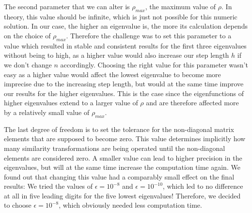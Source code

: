 \documentclass[10pt,a4paper]{article}
\begin{document}
The second parameter that we can alter is $\rho_{max}$, the maximum value of $\rho$. In theory, this value should be infinite, which is just not possible for this numeric solution. In our case, the higher an eigenvalue is, the more its calculation depends on the choice of $\rho_{max}$. Therefore the challenge was to set this parameter to a value which resulted in stable and consistent results for the first three eigenvalues without being to high, as a higher value would also increase our step length $h$ if we don't change $n$ accordingly. Choosing the right value for this parameter wasn't easy as a higher value would affect the lowest eigenvalue to become more imprecise due to the increasing step length, but would at the same time improve our results for the higher eigenvalues. This is the case since the eigenfunctions of higher eigenvalues extend to a larger value of $\rho$ and are therefore affected more by a relatively small value of $\rho_{max}$.

The last degree of freedom is to set the tolerance for the non-diagonal matrix elements that are supposed to become zero. This value determines implicitly how many similarity transformations are being operated until the non-diagonal elements are considered zero. A smaller value can lead to higher precision in the eigenvalues, but will at the same time increase the computation time again. We found out that changing this value had a comparably small effect on the final results: We tried the values of $\epsilon=10^{-8}$ and $\epsilon=10^{-10}$, which led to no difference at all in five leading digits for the five lowest eigenvalues! Therefore, we decided to choose $\epsilon=10^{-8}$, which obviously needed less computation time.
\end{document}
